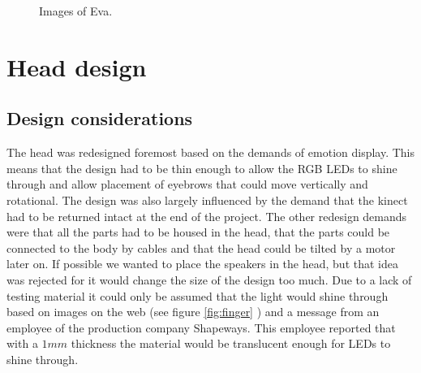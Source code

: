 \documentclass[technical_document.tex]{subfiles}
\begin{document}
 \begin{figure}[h!]
  \centering
  \hspace{2mm}            
  \caption{Images of Eva.}
  \label{Eva}
\end{figure}

\section*{Head design}
\subsection*{Design considerations}
The head was redesigned foremost based on the demands of emotion display. This means that the design had to be thin enough 
to allow the RGB LEDs to shine through and allow placement of eyebrows that could move vertically and rotational. The 
design was also largely influenced by the demand that the kinect had to be returned intact at the end of the project. The 
other redesign demands were that all the parts had to be housed in the head, that the parts could be connected to the body 
by cables and that the head could be tilted by a motor later on. If possible we wanted  to place the speakers in the head, 
but that idea was rejected for it would change the size of the design too much. Due to a lack of testing material it could only be assumed that the light would shine through based on images on the web (see figure \ref{fig:finger} ) and a message 
from an employee of the production company Shapeways. This employee reported that with a $1 mm$ thickness the material would 
be translucent enough for LEDs to shine through.
\end{document}
